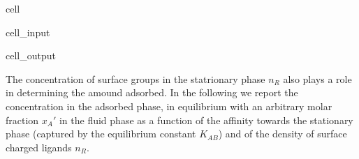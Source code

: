 \documentclass[letterpaper,10pt,english]{jupyterBook}
\begin{document}
\begin{sphinxuseclass}{cell}
\begin{sphinxVerbatimInput}
\begin{sphinxuseclass}{cell_input}
\begin{sphinxVerbatim}[commandchars=\\\{\}]
    
 
 
\end{sphinxVerbatim}

\end{sphinxuseclass}\end{sphinxVerbatimInput}
\begin{sphinxVerbatimOutput}

\begin{sphinxuseclass}{cell_output}
\noindent{}

\end{sphinxuseclass}\end{sphinxVerbatimOutput}

\end{sphinxuseclass}
\sphinxAtStartPar
The concentration of surface groups in the statrionary phase \(n_R\) also plays a role in determining the amound adsorbed. In the following we report the concentration in the adsorbed phase, in equilibrium with an arbitrary molar fraction \(x_A'\) in the fluid phase as a function of the affinity towards the stationary phase (captured by the equilibrium constant \(K_{AB}\)) and of the density of surface charged ligands \(n_R\).
\end{document}
